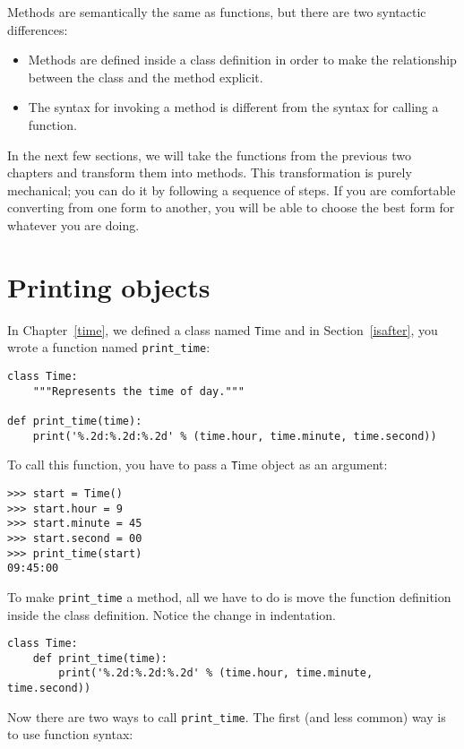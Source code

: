 \documentclass[
DIV=11,
fontsize=12,
twoside,
headinclude=false,
titlepage=firstiscover,
abstract=true,
headsepline=true,
footsepline=true,
chapterprefix=true, %
headings=big,
bibliography=totoc,%
captions=tableheading
]{scrbook}
\theoremstyle{definition}
\begin{document}
Methods are semantically the same as functions, but there are
two syntactic differences:

\begin{itemize}

\item Methods are defined inside a class definition in order
to make the relationship between the class and the method explicit.

\item The syntax for invoking a method is different from the
syntax for calling a function.

\end{itemize}

In the next few sections, we will take the functions from the previous
two chapters and transform them into methods.  This transformation is
purely mechanical; you can do it by following a sequence of
steps.  If you are comfortable converting from one form to another,
you will be able to choose the best form for whatever you are doing.


\section{Printing objects}

In Chapter~\ref{time}, we defined a class named
{\texttt Time} and in Section~\ref{isafter}, you 
wrote a function named \verb"print_time":

\begin{lstlisting}
class Time:
    """Represents the time of day."""

def print_time(time):
    print('%.2d:%.2d:%.2d' % (time.hour, time.minute, time.second))
\end{lstlisting}
%
To call this function, you have to pass a {\texttt Time} object as an
argument:

\begin{lstlisting}
>>> start = Time()
>>> start.hour = 9
>>> start.minute = 45
>>> start.second = 00
>>> print_time(start)
09:45:00
\end{lstlisting}
%
To make \verb"print_time" a method, all we have to do is
move the function definition inside the class definition.  Notice
the change in indentation.

\begin{lstlisting}
class Time:
    def print_time(time):
        print('%.2d:%.2d:%.2d' % (time.hour, time.minute, time.second))
\end{lstlisting}
%
Now there are two ways to call \verb"print_time".  The first
(and less common) way is to use function syntax:
\end{document}
